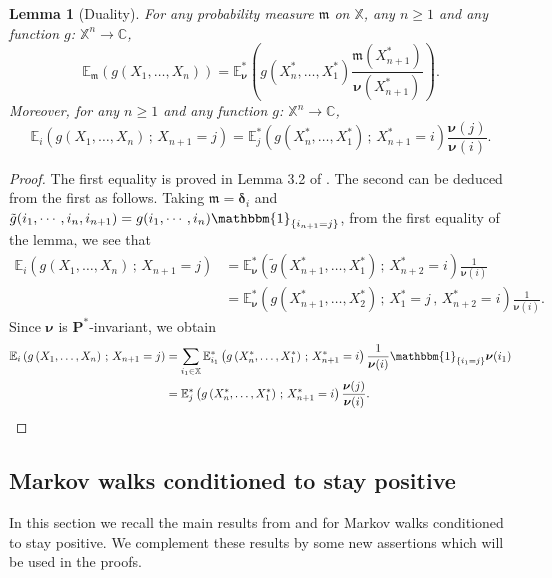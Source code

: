 \documentclass[12pt]{amsart}
\newtheorem{lemma}[theorem]{Lemma}
\theoremstyle{definition}
\numberwithin{equation}{section}
\def\bb#1{\mathbb{#1}}
\def\bs#1{\boldsymbol{#1}}
\def\bf#1{\mathbf{#1}}
\def\bbm#1{\mathbbm{#1}}
\def\tt#1{\tilde{#1}}
\def\geq{\geqslant}
\begin{document}
\begin{lemma}[Duality]
\label{dualityBP}
For any probability measure $\mathfrak{m}$ on $\bb X$, any $n\geq 1$ and any function $g$: $\bb X^n \to \bb C$,
\[
\bb E_{\mathfrak{m}} \left( g \left( X_1, \dots, X_n \right) \right) = \bb E_{\bs \nu}^* \left( g \left( X_n^*, \dots, X_1^* \right) \frac{\mathfrak{m} \left( X_{n+1}^* \right)}{\bs \nu \left( X_{n+1}^* \right)} \right).
\]
Moreover, for any $n\geq 1$ and any function $g$: $\bb X^n \to \bb C$,
\[
\bb E_i \left( g \left( X_1, \dots, X_n \right) \,;\, X_{n+1} = j \right) = \bb E_j^* \left( g \left( X_n^*, \dots, X_1^* \right) \,;\, X_{n+1}^* = i \right) \frac{\bs \nu(j)}{\bs \nu(i)}.
\]
\end{lemma}

\begin{proof}
The first equality is proved in Lemma 3.2 of \cite{GLLP_CLLT_2017}. 
The second can be deduced from the first as follows. Taking $\mathfrak{m} = \bs \delta_i$ and $\tt g(i_1,\cdots,i_n,i_{n+1}) = g(i_1,\cdots,i_n)\bbm 1_{\{ i_{n+1} = j \}}$, 
from the first equality of the lemma, we see that
\begin{align*}
	\bb E_i \left( g \left( X_1, \dots, X_n \right) \,;\, X_{n+1} = j \right) &= \bb E_{\bs \nu}^* \left( \tt g \left( X_{n+1}^*, \dots, X_1^* \right) \,;\, X_{n+2}^* = i \right) \frac{1}{\bs \nu(i)} \\
	&= \bb E_{\bs \nu}^* \left( g \left( X_{n+1}^*, \dots, X_2^* \right) \,;\, X_1^* = j \,,\, X_{n+2}^* = i \right) \frac{1}{\bs \nu(i)}.
\end{align*}
Since $\bs \nu$ is $\bf P^*$-invariant, we obtain
\begin{align*}
	\bb E_i \left( g \left( X_1, \dots, X_n \right) \,;\, X_{n+1} = j \right) &= \sum_{i_1 \in \bb X} \bb E_{i_1}^* \left( g \left( X_n^*, \dots, X_1^* \right) \,;\, X_{n+1}^* = i \right) \frac{1}{\bs \nu(i)} \bbm 1_{\{ i_1 = j \}} \bs \nu(i_1) \\
	&=\bb E_j^* \left( g \left( X_n^*, \dots, X_1^* \right) \,;\, X_{n+1}^* = i \right) \frac{\bs \nu(j)}{\bs \nu(i)}. 
\end{align*}
\end{proof}


\subsection{Markov walks conditioned to stay positive}
\label{flamme}


In this section we recall the main results from \cite{grama_limit_2016-1}  and \cite{GLLP_CLLT_2017} for Markov walks conditioned to stay positive. We complement these results by some new assertions which will be used in the proofs.
\end{document}
